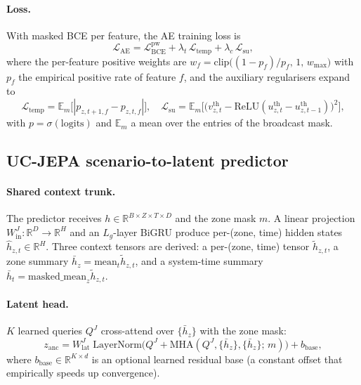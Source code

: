\documentclass{article}
\begin{document}
\paragraph{Loss.}
With masked BCE per feature, the AE training loss is
\begin{equation}
\mathcal{L}_{\mathrm{AE}} = \mathcal{L}_{\mathrm{BCE}}^{\mathrm{pw}} + \lambda_t\,\mathcal{L}_{\mathrm{temp}} + \lambda_c\,\mathcal{L}_{\mathrm{su}},
\end{equation}
where the per-feature positive weights are $w_f = \mathrm{clip}\bigl((1-p_f)/p_f,\,1,\,w_{\max}\bigr)$ with $p_f$ the empirical positive rate of feature $f$, and the auxiliary regularisers expand to
\begin{equation}
\mathcal{L}_{\mathrm{temp}} = \mathbb{E}_m\bigl[|p_{z,t+1,f} - p_{z,t,f}|\bigr], \quad
\mathcal{L}_{\mathrm{su}} = \mathbb{E}_m\bigl[\bigl(v^{\mathrm{th}}_{z,t} - \mathrm{ReLU}(u^{\mathrm{th}}_{z,t} - u^{\mathrm{th}}_{z,t-1})\bigr)^2\bigr],
\end{equation}
with $p = \sigma(\mathrm{logits})$ and $\mathbb{E}_m$ a mean over the entries of the broadcast mask.

\subsection{UC-JEPA scenario-to-latent predictor}
\label{app:uc_jepa_arch}

\paragraph{Shared context trunk.}
The predictor receives $h \in \mathbb{R}^{B\times Z\times T\times D}$ and the zone mask $m$. A linear projection $W_{\mathrm{in}}^J: \mathbb{R}^D \to \mathbb{R}^H$ and an $L_g$-layer BiGRU produce per-(zone, time) hidden states $\hat h_{z,t} \in \mathbb{R}^H$. Three context tensors are derived: a per-(zone, time) tensor $\tilde h_{z,t}$, a zone summary $\bar h_z = \mathrm{mean}_t \tilde h_{z,t}$, and a system-time summary $\bar h_t = \mathrm{masked\_mean}_z \tilde h_{z,t}$.

\paragraph{Latent head.}
$K$ learned queries $Q^J$ cross-attend over $\{\bar h_z\}$ with the zone mask:
\begin{equation}
z_{\mathrm{anc}} = W_{\mathrm{lat}}^J\;\mathrm{LayerNorm}\!\bigl(Q^J + \mathrm{MHA}(Q^J, \{\bar h_z\}, \{\bar h_z\};\,m)\bigr) + b_{\mathrm{base}},
\label{eq:jepa_lat}
\end{equation}
where $b_{\mathrm{base}} \in \mathbb{R}^{K\times d}$ is an optional learned residual base (a constant offset that empirically speeds up convergence).
\end{document}
